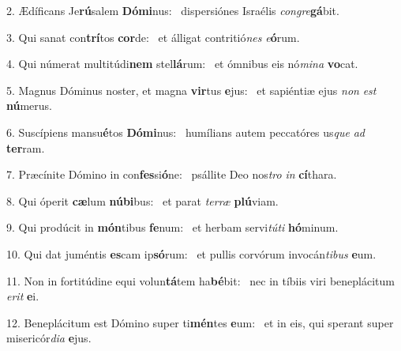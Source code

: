 2. Ædíficans Je\textbf{rú}salem \textbf{Dó}\textbf{mi}nus: \ast\  dispersiónes Israélis \textit{con}\textit{gre}\textbf{gá}bit.\

3. Qui sanat con\textbf{trí}tos \textbf{cor}de: \ast\  et álligat contritió\textit{nes} \textit{e}\textbf{ó}rum.\

4. Qui númerat multitúdi\textbf{nem} stel\textbf{lá}rum: \ast\  et ómnibus eis nó\textit{mi}\textit{na} \textbf{vo}cat.\

5. Magnus Dóminus noster, et magna \textbf{vir}tus \textbf{e}jus: \ast\  et sapiéntiæ ejus \textit{non} \textit{est} \textbf{nú}merus.\

6. Suscípiens mansu\textbf{é}tos \textbf{Dó}\textbf{mi}nus: \ast\  humílians autem peccatóres us\textit{que} \textit{ad} \textbf{ter}ram.\

7. Præcínite Dómino in con\textbf{fes}si\textbf{ó}ne: \ast\  psállite Deo nos\textit{tro} \textit{in} \textbf{cí}thara.\

8. Qui óperit \textbf{cæ}lum \textbf{nú}\textbf{bi}bus: \ast\  et parat \textit{ter}\textit{ræ} \textbf{plú}viam.\

9. Qui prodúcit in \textbf{món}tibus \textbf{fe}num: \ast\  et herbam servi\textit{tú}\textit{ti} \textbf{hó}minum.\

10. Qui dat juméntis \textbf{es}cam ip\textbf{só}rum: \ast\  et pullis corvórum invocán\textit{ti}\textit{bus} \textbf{e}um.\

11. Non in fortitúdine equi volun\textbf{tá}tem ha\textbf{bé}bit: \ast\  nec in tíbiis viri beneplácitum \textit{e}\textit{rit} \textbf{e}i.\

12. Beneplácitum est Dómino super ti\textbf{mén}tes \textbf{e}um: \ast\  et in eis, qui sperant super misericór\textit{di}\textit{a} \textbf{e}jus.\

